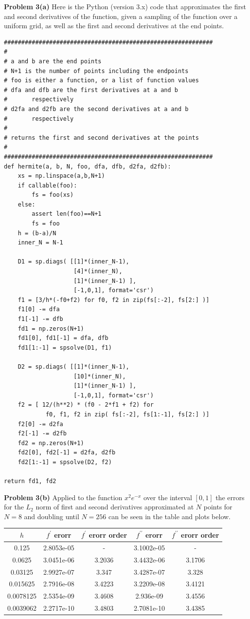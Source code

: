 \documentclass[12pt]{article}
\newcommand{\problem}[1]{\hspace{-4 ex} \large \textbf{Problem #1} }
\begin{document}
\problem{3(a)} Here is the Python (version 3.x) code that approximates the first and second derivatives of the function, given a sampling of the function over a uniform grid, as well as the first and second derivatives at the end points. 
\begin{lstlisting}
############################################################
#
# a and b are the end points
# N+1 is the number of points including the endpoints
# foo is either a function, or a list of function values
# dfa and dfb are the first derivatives at a and b 
# 		respectively
# d2fa and d2fb are the second derivatives at a and b 
# 		respectively
# 
# returns the first and second derivatives at the points
#
############################################################
def hermite(a, b, N, foo, dfa, dfb, d2fa, d2fb):
	xs = np.linspace(a,b,N+1)
	if callable(foo):
		fs = foo(xs)
	else:
		assert len(foo)==N+1
		fs = foo
	h = (b-a)/N
	inner_N = N-1
	
	D1 = sp.diags( [[1]*(inner_N-1), 
					[4]*(inner_N),
					[1]*(inner_N-1) ],
					[-1,0,1], format='csr')
	f1 = [3/h*(-f0+f2) for f0, f2 in zip(fs[:-2], fs[2:] )]
	f1[0] -= dfa
	f1[-1] -= dfb
	fd1 = np.zeros(N+1)
	fd1[0], fd1[-1] = dfa, dfb
	fd1[1:-1] = spsolve(D1, f1)
	
	D2 = sp.diags( [[1]*(inner_N-1),
					[10]*(inner_N),
					[1]*(inner_N-1) ], 
					[-1,0,1], format='csr')
	f2 = [ 12/(h**2) * (f0 - 2*f1 + f2) for
		 	f0, f1, f2 in zip( fs[:-2], fs[1:-1], fs[2:] )]
	f2[0] -= d2fa
	f2[-1] -= d2fb
	fd2 = np.zeros(N+1)
	fd2[0], fd2[-1] = d2fa, d2fb
	fd2[1:-1] = spsolve(D2, f2)

return fd1, fd2
\end{lstlisting}
\bigbreak


\problem{3(b)} Applied to the function $x^2e^{-x}$ over the interval $[0,1]$ the errors for the $L_2$ norm of first and second derivatives approximated at $N$ points for $N=8$ and doubling until $N=256$ can be seen in the table and plots below.\\

\begin{center}
	\begin{tabular}{|c|c|c|c|c|}
		\hline
		$h$&$f^\prime$ erorr&$f^\prime$ erorr order&$f^{\prime\prime}$ erorr&$f^{\prime\prime}$ erorr order\\ \hline
		0.125&2.8053e-05&-&3.1002e-05&-\\ \hline
		0.0625&3.0451e-06&3.2036&3.4432e-06&3.1706\\ \hline
		0.03125&2.9927e-07&3.347&3.4287e-07&3.328\\ \hline
		0.015625&2.7916e-08&3.4223&3.2209e-08&3.4121\\ \hline
		0.0078125&2.5354e-09&3.4608&2.936e-09&3.4556\\ \hline
		0.0039062&2.2717e-10&3.4803&2.7081e-10&3.4385\\ \hline
	\end{tabular}
\end{center}
\end{document}
